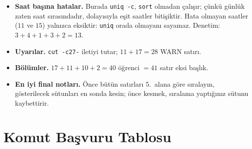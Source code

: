 \documentclass[11pt,a4paper]{article}
\newcommand{\cmd}[1]{\texttt{#1}}
\begin{document}
\begin{itemize}
  \item \textbf{Saat başına hatalar.} Burada \cmd{uniq -c}, \cmd{sort} olmadan çalışır; çünkü günlük zaten saat sırasındadır, dolayısıyla eşit saatler bitişiktir. Hata olmayan saatler ($11$ ve $15$) yalnızca eksiktir: \cmd{uniq} orada olmayanı sayamaz. Denetim: $3 + 4 + 1 + 3 + 2 = 13$.
  \item \textbf{Uyarılar.} \cmd{cut -c27-} iletiyi tutar; $11 + 17 = 28$ WARN satırı.
  \item \textbf{Bölümler.} $17 + 11 + 10 + 2 = 40$ öğrenci $= 41$ satır eksi başlık.
  \item \textbf{En iyi final notları.} Önce bütün satırları $5$.~alana göre sıralayın, gösterilecek sütunları en sonda kesin; önce kesmek, sıralama yaptığınız sütunu kaybettirir.
\end{itemize}

\section{Komut Başvuru Tablosu}
\label{sec:ref}
\end{document}
